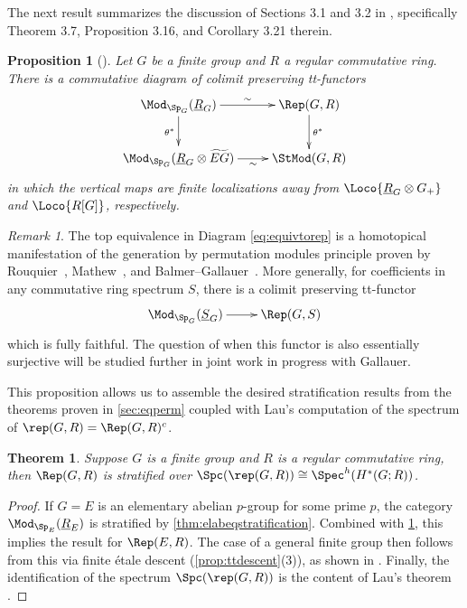 \documentclass{amsart}%
\numberwithin{equation}{section}%
\newtheorem{Thm}[subsection]{Theorem}
\newtheorem{Prop}[subsection]{Proposition}
\theoremstyle{remark}
\newtheorem{Rem}[subsection]{Remark}
\begin{document}
The next result summarizes the discussion of Sections 3.1 and 3.2 in \cite{barthel_integral1}, specifically Theorem 3.7, Proposition 3.16, and Corollary 3.21 therein.

\begin{Prop}[\cite{barthel_integral1}]\label{prop:eqreptranslation}
Let $G$ be a finite group and $R$ a regular commutative ring. There is a commutative diagram of colimit preserving tt-functors
\begin{equation}\label{eq:equivtorep}
    \vcenter{
    \xymatrix{\Mod_{\Sp_G}(\underline{R}_G) \ar[r]^-{\sim} \ar[d]_{\theta^*} & \Rep(G,R) \ar[d]^{\theta^*} \\
    \Mod_{\Sp_G}(\underline{R}_G \otimes \widetilde{EG}) \ar[r]_-{\sim} & \StMod(G,R)}
    }
\end{equation}
in which the vertical maps are finite localizations away from $\Loco{\underline{R}_G\otimes G_+}$ and $\Loco{R[G]}$, respectively. 
\end{Prop}

\begin{Rem}
The top equivalence in Diagram \eqref{eq:equivtorep} is a homotopical manifestation of the generation by permutation modules principle proven by Rouquier~\cite{Rouquier_letter}, Mathew~\cite[App.~A]{treumannmathew_reps}, and Balmer--Gallauer~\cite{balmergallauer_permmodulesres}. More generally, for coefficients in any commutative ring spectrum $S$, there is a colimit preserving tt-functor
\[
\xymatrix{\Mod_{\Sp_G}(\underline{S}_G) \ar[r] & \Rep(G,S)}
\]
which is fully faithful. The question of when this functor is also essentially surjective will be studied further in joint work in progress with Gallauer. 
\end{Rem}

This proposition allows us to assemble the desired stratification results from the theorems proven in \cref{sec:eqperm} coupled with Lau's computation of the spectrum of $\rep(G,R) = \Rep(G,R)^c$.

\begin{Thm}\label{thm:repstratification}
Suppose $G$ is a finite group and $R$ is a regular commutative ring, then $\Rep(G,R)$ is stratified over $\Spc(\rep(G,R)) \cong \Spec^h(H^*(G;R))$.
\end{Thm}
\begin{proof}
If $G = E$ is an elementary abelian $p$-group for some prime $p$, the category $\Mod_{\Sp_E}(\underline{R}_E)$ is stratified by \cref{thm:elabeqstratification}. Combined with \cref{prop:eqreptranslation}, this implies the result for $\Rep(E,R)$. The case of a general finite group then follows from this via finite \'etale descent (\cref{prop:ttdescent}(3)), as shown in \cite[Thm.~4.18(1)]{barthel_integral1}. Finally, the identification of the spectrum $\Spc(\rep(G,R))$ is the content of Lau's theorem \cite{lau_spcdmstacks}.
\end{proof}
\end{document}
